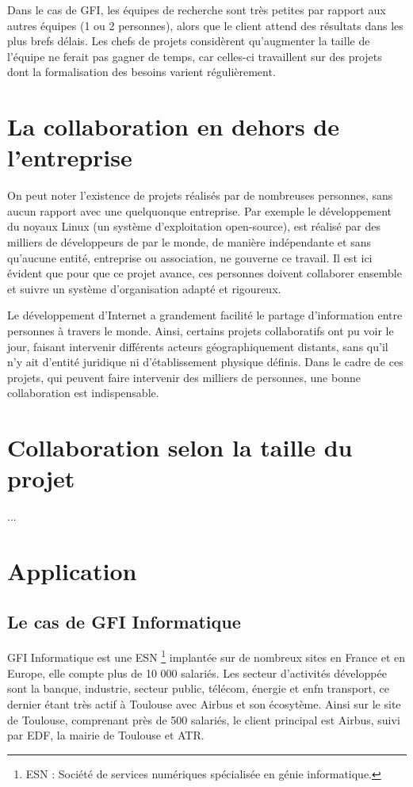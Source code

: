 \begin{app}
Dans le cas de GFI, les équipes de recherche sont très petites par rapport aux autres équipes (1 ou 2 personnes), alors que le client attend des résultats dans les plus brefs délais. Les chefs de projets considèrent qu'augmenter la taille de l'équipe ne ferait pas gagner de temps, car celles-ci travaillent sur des projets dont la formalisation des besoins varient régulièrement.
\end{app}

\section{La collaboration en dehors de l'entreprise}

On peut noter l'existence de projets réalisés par de nombreuses personnes, sans aucun rapport avec une quelquonque entreprise. Par exemple le développement du noyaux Linux (un système d'exploitation open-source), est réalisé par des milliers de développeurs de par le monde, de manière indépendante et sans qu'aucune entité, entreprise ou  association, ne gouverne ce travail. Il est ici évident que pour que ce projet avance, ces personnes doivent collaborer ensemble et suivre un système d'organisation adapté et rigoureux.

Le développement d'Internet a grandement facilité le partage d'information entre personnes à travers le monde. Ainsi, certains projets collaboratifs ont pu voir le jour, faisant intervenir différents acteurs géographiquement distants, sans qu'il n'y ait d'entité juridique ni d'établissement physique définis. Dans le cadre de ces projets, qui peuvent faire intervenir des milliers de personnes, une bonne collaboration est indispensable.

\section{Collaboration selon la taille du projet}

...

\section{Application}

\subsection{Le cas de GFI Informatique}

GFI Informatique est une \gls{ESN} \footnote{ESN : Société de services numériques spécialisée en génie informatique.} implantée sur de nombreux sites en France et en Europe, elle compte plus de 10 000 salariés. Les secteur d'activités développée sont la banque, industrie, secteur public, télécom, énergie et enfn transport, ce dernier étant très actif à Toulouse avec Airbus et son écosytème. Ainsi sur le site de Toulouse, comprenant près de 500 salariés, le client principal est Airbus, suivi par EDF, la mairie de Toulouse et ATR.

